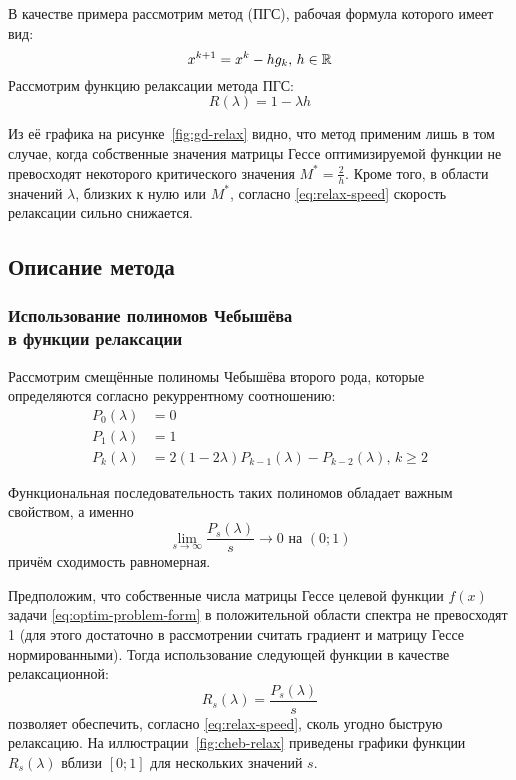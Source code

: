 В качестве примера рассмотрим метод  (ПГС), рабочая формула которого имеет вид:
\begin{equation}
  \label{eq:gd-workhorse}
  x^{k+1}=x^k-hg_k,\, h\in\mathbb{R}
\end{equation}
Рассмотрим функцию релаксации метода ПГС:
\begin{equation}
  \label{eq:gd-relax}
  R(\lambda) = 1 - \lambda h
\end{equation}



Из её графика на рисунке \ref{fig:gd-relax} видно, что метод применим
лишь в том случае, когда собственные значения матрицы Гессе
оптимизируемой функции не превосходят некоторого критического значения
$M^*=\frac{2}{h}$. Кроме того, в области значений $\lambda$, близких к
нулю или $M^*$, согласно \eqref{eq:relax-speed} скорость релаксации
сильно снижается.

\subsection{Описание метода \relch}

\subsubsection{Использование полиномов Чебышёва\\
  в функции релаксации}

Рассмотрим смещённые полиномы Чебышёва второго рода, которые
определяются согласно рекуррентному соотношению:
\begin{align}
  \label{eq:chebyshev}
  P_0(\lambda) &= 0 \\
  P_1(\lambda) &= 1 \\
  P_k(\lambda) &= 2(1-2\lambda)P_{k-1}(\lambda) - P_{k-2}(\lambda),\, k
  \geq 2
\end{align}

Функциональная последовательность таких полиномов обладает важным
свойством, а именно
\begin{equation}
  \label{eq:cheb-limit}
  \lim_{s\to\infty}{\frac{P_s(\lambda)}{s}} \to 0 \text{ на } (0;1)
\end{equation}
причём сходимость равномерная.

Предположим, что собственные числа матрицы Гессе целевой функции
$f(x)$ задачи \eqref{eq:optim-problem-form} в положительной области
спектра не превосходят 1 (для этого достаточно в рассмотрении считать
градиент и матрицу Гессе нормированными). Тогда использование
следующей функции в качестве релаксационной:
\begin{equation}
  \label{eq:cheb-relax}
  R_s(\lambda) = \frac{P_s(\lambda)}{s}
\end{equation}
позволяет обеспечить, согласно \eqref{eq:relax-speed}, сколь угодно
быструю релаксацию. На иллюстрации \ref{fig:cheb-relax} приведены
графики функции $R_s(\lambda)$ вблизи $[0;1]$ для нескольких значений
$s$.

